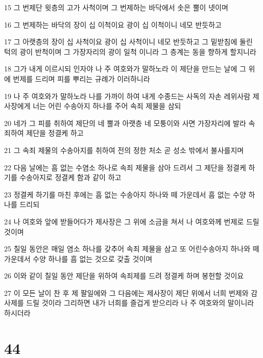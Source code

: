 \par 15 그 번제단 윗층의 고가 사척이며 그 번제하는 바닥에서 솟은 뿔이 넷이며
\par 16 그 번제하는 바닥의 장이 십 이척이요 광이 십 이척이니 네모 반듯하고
\par 17 그 아랫층의 장이 십 사척이요 광이 십 사척이니 네모 반듯하고 그 밑받침에 둘린 턱의 광이 반척이며 그 가장자리의 광이 일척 이니라 그 층계는 동을 향하게 할지니라
\par 18 그가 내게 이르시되 인자야 나 주 여호와가 말하노라 이 제단을 만드는 날에 그 위에 번제를 드리며 피를 뿌리는 규례가 이러하니라
\par 19 나 주 여호와가 말하노라 나를 가까이 하여 내게 수종드는 사독의 자손 레위사람 제사장에게 너는 어린 수송아지 하나를 주어 속죄 제물을 삼되
\par 20 네가 그 피를 취하여 제단의 네 뿔과 아랫층 네 모퉁이와 사면 가장자리에 발라 속죄하여 제단을 정결케 하고
\par 21 그 속죄 제물의 수송아지를 취하여 전의 정한 처소 곧 성소 밖에서 불사를지며
\par 22 다음 날에는 흠 없는 수염소 하나로 속죄 제물을 삼아 드려서 그 제단을 정결케 하기를 수송아지로 정결케 함과 같이 하고
\par 23 정결케 하기를 마친 후에는 흠 없는 수송아지 하나와 떼 가운데서 흠 없는 수양 하나를 드리되
\par 24 나 여호와 앞에 받들어다가 제사장은 그 위에 소금을 쳐서 나 여호와께 번제로 드릴 것이며
\par 25 칠일 동안은 매일 염소 하나를 갖추어 속죄 제물을 삼고 또 어린수송아지 하나와 떼 가운데서 수양 하나를 흠 없는 것으로 갖출 것이며
\par 26 이와 같이 칠일 동안 제단을 위하여 속죄제를 드려 정결케 하며 봉헌할 것이요
\par 27 이 모든 날이 찬 후 제 팔일에와 그 다음에는 제사장이 제단 위에서 너희 번제와 감사제를 드릴 것이라 그리하면 내가 너희를 즐겁게 받으리라 나 주 여호와의 말이니라 하시더라

\chapter{44}

